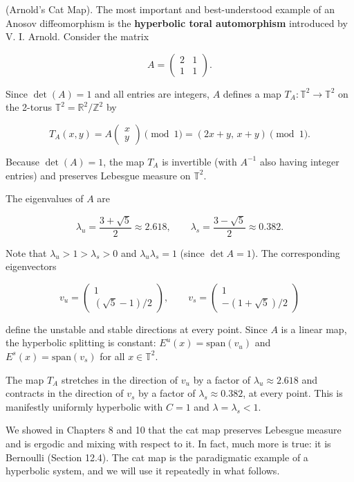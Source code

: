 \begin{example}
(Arnold's Cat Map). The most important and best-understood example of an Anosov diffeomorphism is the \textbf{hyperbolic toral automorphism} introduced by V. I. Arnold. Consider the matrix

\[
A = \begin{pmatrix} 2 & 1 \\ 1 & 1 \end{pmatrix}.
\]

Since $\det(A) = 1$ and all entries are integers, $A$ defines a map $T_A: \mathbb{T}^2 \to \mathbb{T}^2$ on the 2-torus $\mathbb{T}^2 = \mathbb{R}^2 / \mathbb{Z}^2$ by

\[
T_A(x, y) = A \begin{pmatrix} x \\ y \end{pmatrix} \pmod{1} = (2x + y, \, x + y) \pmod{1}.
\]

Because $\det(A) = 1$, the map $T_A$ is invertible (with $A^{-1}$ also having integer entries) and preserves Lebesgue measure on $\mathbb{T}^2$.

The eigenvalues of $A$ are

\[
\lambda_u = \frac{3 + \sqrt{5}}{2} \approx 2.618, \qquad \lambda_s = \frac{3 - \sqrt{5}}{2} \approx 0.382.
\]

Note that $\lambda_u > 1 > \lambda_s > 0$ and $\lambda_u \lambda_s = 1$ (since $\det A = 1$). The corresponding eigenvectors

\[
v_u = \begin{pmatrix} 1 \\ (\sqrt{5}-1)/2 \end{pmatrix}, \qquad v_s = \begin{pmatrix} 1 \\ -(1+\sqrt{5})/2 \end{pmatrix}
\]

define the unstable and stable directions at every point. Since $A$ is a linear map, the hyperbolic splitting is constant: $E^u(x) = \text{span}(v_u)$ and $E^s(x) = \text{span}(v_s)$ for all $x \in \mathbb{T}^2$.

The map $T_A$ stretches in the direction of $v_u$ by a factor of $\lambda_u \approx 2.618$ and contracts in the direction of $v_s$ by a factor of $\lambda_s \approx 0.382$, at every point. This is manifestly uniformly hyperbolic with $C = 1$ and $\lambda = \lambda_s < 1$.

We showed in Chapters 8 and 10 that the cat map preserves Lebesgue measure and is ergodic and mixing with respect to it. In fact, much more is true: it is Bernoulli (Section 12.4). The cat map is the paradigmatic example of a hyperbolic system, and we will use it repeatedly in what follows.


\end{example}
